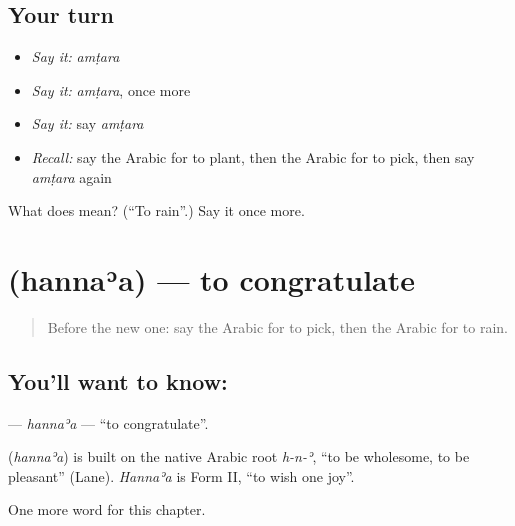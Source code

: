 \subsection*{Your turn}
\begin{itemize}
\raggedright
  \item \emph{Say it:} \emph{amṭara}
  \item \emph{Say it:} \emph{amṭara}, once more
  \item \emph{Say it:} say \emph{amṭara}
  \item \emph{Recall:} say the Arabic for to plant, then the Arabic for to pick, then say \emph{amṭara} again
\end{itemize}

\begin{tcolorbox}[breakable,colback=teal!4,colframe=teal!35!black,title={Before you move on}]
What does  mean? (\textquotedblleft{}To rain\textquotedblright{}.) Say it once more.
\end{tcolorbox}
\section[\texorpdfstring{\ar{هنأ} (hannaʾa)}{هنأ (hannaʾa)}]{ (hannaʾa) — to congratulate}

\label{lesson:AR-C196-hannaa}



\begin{quote}
Before the new one: say the Arabic for to pick, then the Arabic for to rain.
\end{quote}

\subsection*{You'll want to know: }
\textbf{} — \emph{hannaʾa} — \textquotedblleft{}to congratulate\textquotedblright{}.

\begin{cousinweb}
\textbf{} (\emph{hannaʾa}) is built on the native Arabic root \emph{h-n-ʾ}, \textquotedblleft{}to be wholesome, to be pleasant\textquotedblright{} (Lane). \emph{Hannaʾa} is Form II, \textquotedblleft{}to wish one joy\textquotedblright{}.
\end{cousinweb}

\begin{grammarlens}[title={What you've built}]
One more word for this chapter.
\end{grammarlens}

